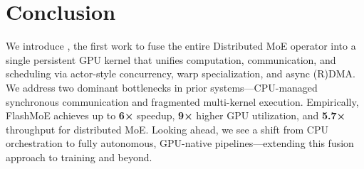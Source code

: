 \section{Conclusion}\label{sec:conclusion-and-future-work}
We introduce \sysname, the first work to fuse the entire Distributed MoE operator into a
single persistent GPU kernel that unifies computation,
communication, and scheduling via actor-style concurrency, warp specialization, and async (R)DMA\@.
We address two dominant bottlenecks in prior systems—CPU-managed synchronous communication and fragmented multi-kernel execution.
Empirically, FlashMoE achieves up to \textbf{6×} speedup, \textbf{9×} higher GPU utilization, and \textbf{5.7×}
throughput for distributed MoE. Looking ahead, we see a shift from CPU orchestration to fully autonomous,
GPU-native pipelines—extending this fusion approach to training and beyond.



